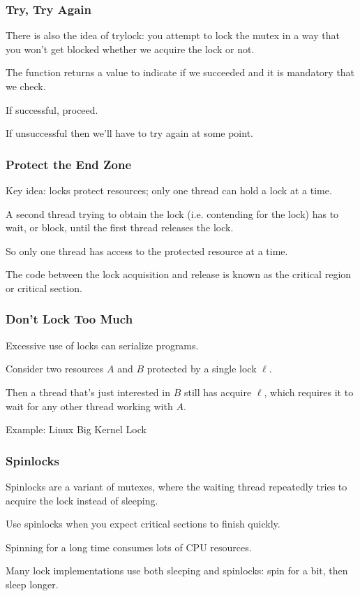 \begin{frame}
\frametitle{Try, Try Again}

There is also the idea of trylock: you attempt to lock the mutex in a way that you won't get blocked whether we acquire the lock or not. 

The function returns a value to indicate if we succeeded and it is mandatory that we check. 

If successful, proceed. 

If unsuccessful then we'll have to try again at some point.
\end{frame}

\begin{frame}
\frametitle{Protect the End Zone}

Key idea: locks protect resources; only one thread
can hold a lock at a time. 

A second thread trying to obtain the lock
(i.e. \alert{contending} for the lock) has to wait, or \alert{block},
until the first thread releases the lock. 

So only one thread has
access to the protected resource at a time. 

The code between the lock
acquisition and release is known as the \alert{critical region} or \alert{critical section}.

\end{frame}



\begin{frame}
\frametitle{Don't Lock Too Much}

Excessive use of locks can serialize programs. 

Consider two resources
$A$ and $B$ protected by a single lock $\ell$. 

Then a thread that's
just interested in $B$ still has acquire $\ell$, which requires it to
wait for any other thread working with $A$.

Example: Linux Big Kernel Lock

\end{frame}



\begin{frame}
\frametitle{Spinlocks}

Spinlocks are a variant of mutexes, where the
waiting thread repeatedly tries to acquire the lock instead of sleeping.

Use spinlocks when you expect critical sections to finish 
quickly.

Spinning
for a long time consumes lots of CPU resources.

 Many lock
implementations use both sleeping and spinlocks: spin for a bit,
then sleep longer.


\end{frame}



